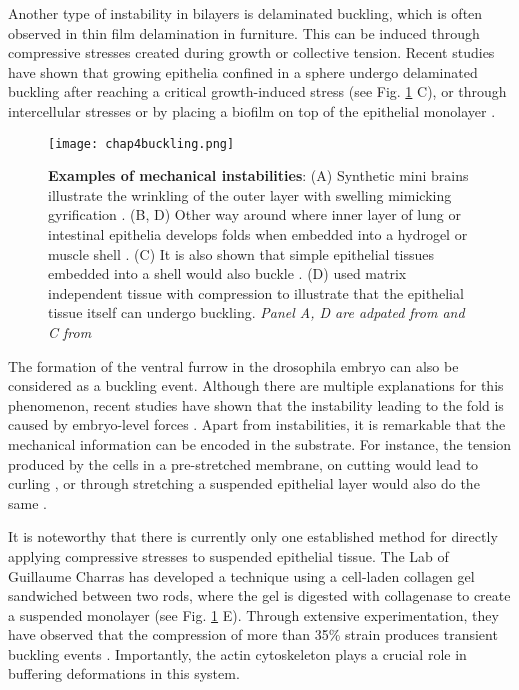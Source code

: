 Another type of instability in bilayers is delaminated buckling, which is often observed in thin film delamination in furniture. This can be induced through compressive stresses created during growth or collective tension. Recent studies have shown that growing epithelia confined in a sphere undergo delaminated buckling after reaching a critical growth-induced stress \cite{trushko2020} (see Fig. \ref{fig_4_6} C), or through intercellular stresses \cite{oyama2021} or by placing a biofilm on top of the epithelial monolayer \cite{cont2020}.

\begin{figure}
	\centering
	\texttt{[image: chap4buckling.png]}
	\caption{\label{fig_4_6} \textbf{Examples of mechanical instabilities}: (A) Synthetic mini brains illustrate the wrinkling of the outer layer with swelling mimicking gyrification \cite{tallinen2016}. (B, D) Other way around where inner layer of lung or intestinal epithelia develops folds when embedded into a hydrogel or muscle shell \cite{varner2015, shyer2013}. (C) It is also shown that simple epithelial tissues embedded into a shell would also buckle \cite{trushko2020}. (D) \cite{wyatt2020} used matrix independent tissue with compression to illustrate that the epithelial tissue itself can undergo buckling. \textit{Panel A, D are adpated from \cite{collinet2021} and C from \cite{matejcic2020}}
	}
\end{figure}

The formation of the ventral furrow in the drosophila embryo can also be considered as a buckling event. Although there are multiple explanations for this phenomenon, recent studies have shown that the instability leading to the fold is caused by embryo-level forces \cite{guo2022, fierling2022}. Apart from instabilities, it is remarkable that the mechanical information can be encoded in the substrate. For instance, the tension produced by the cells in a pre-stretched membrane, on cutting would lead to curling \cite{tomba2022}, or through stretching a suspended epithelial layer would also do the same \cite{fouchard2020}.

It is noteworthy that there is currently only one established method for directly applying compressive stresses to suspended epithelial tissue. The Lab of Guillaume Charras has developed a technique using a cell-laden collagen gel sandwiched between two rods, where the gel is digested with collagenase to create a suspended monolayer (see Fig. \ref{fig_4_6} E). Through extensive experimentation, they have observed that the compression of more than 35\% strain produces transient buckling events \cite{wyatt2020}. Importantly, the actin cytoskeleton plays a crucial role in buffering deformations in this system.

